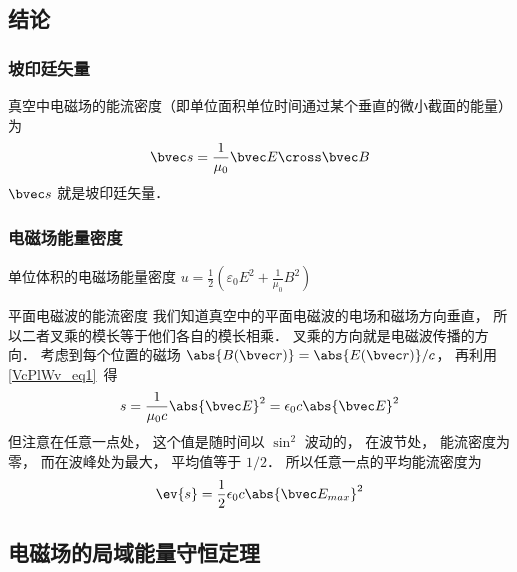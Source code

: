 


\subsection{结论}

\subsubsection{坡印廷矢量}
真空中电磁场的能流密度（即单位面积单位时间通过某个垂直的微小截面的能量）为 %
\begin{equation}
\bvec s = \frac{1}{\mu_0} \bvec E \cross \bvec B
\end{equation} 
$\bvec s$ 就是坡印廷矢量．

\subsubsection{电磁场能量密度}
单位体积的电磁场能量密度
$u=\frac{1}{2}(\varepsilon_0 E^2+ \frac{1}{\mu_0} B^2)$ \cite{GriffE}

\begin{example}{平面电磁波的能流密度}\label{EBS_ex1}
我们知道真空中的平面电磁波的电场和磁场方向垂直， 所以二者叉乘的模长等于他们各自的模长相乘． 叉乘的方向就是电磁波传播的方向． 考虑到每个位置的磁场 $\abs{B(\bvec r)} = \abs{E(\bvec r)}/c$， 再利用\autoref{VcPlWv_eq1}~得
\begin{equation}
s = \frac{1}{\mu_0 c} \abs{\bvec E}^2 = \epsilon_0 c \abs{\bvec E}^2
\end{equation}
但注意在任意一点处， 这个值是随时间以 $\sin^2$ 波动的， 在波节处， 能流密度为零， 而在波峰处为最大， 平均值等于 $1/2$． %
所以任意一点的平均能流密度为
\begin{equation}
\ev{s} = \frac{1}{2} \epsilon_0 c \abs{\bvec E_{max}}^2
\end{equation}
\end{example}

\subsection{电磁场的局域能量守恒定理}

